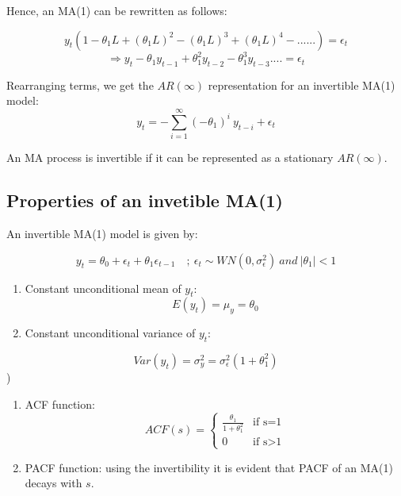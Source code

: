 \documentclass[]{book}
\theoremstyle{definition}
\theoremstyle{definition}
\theoremstyle{definition}
\theoremstyle{remark}
\let\BeginKnitrBlock\begin \let\EndKnitrBlock\end
\begin{document}
Hence, an MA(1) can be rewritten as follows:

\[y_t (1-\theta_1 L+(\theta_1L)^2-(\theta_1L)^3+ (\theta_1L)^4-......)=\epsilon_t\]
\[\Rightarrow y_t -\theta_1 y_{t-1} +\theta_1^2y_{t-2}-\theta_1^3 y_{t-3}....=\epsilon_t\]

Rearranging terms, we get the \(AR(\infty)\) representation for an
invertible MA(1) model:
\[y_t=-\sum_{i=1}^{\infty}(-\theta_1)^i \ y_{t-i}+\epsilon_t\]

\BeginKnitrBlock{definition}
\protect\hypertarget{def:unnamed-chunk-8}{}{\label{def:unnamed-chunk-8} }An
MA process is invertible if it can be represented as a stationary
\(AR(\infty)\).
\EndKnitrBlock{definition}

\hypertarget{properties-of-an-invetible-ma1}{%
\subsection{Properties of an invetible
MA(1)}\label{properties-of-an-invetible-ma1}}

An invertible MA(1) model is given by:

\[ y_t = \theta_0 + \epsilon_t + \theta_1 \epsilon_{t-1} \quad ; \ \epsilon_t\sim WN(0, \sigma_\epsilon^2) \ and \  |\theta_1|<1\]

\begin{enumerate}
\def\labelenumi{\arabic{enumi}.}
\item
  Constant unconditional mean of \(y_t\): \[E(y_t)=\mu_y =\theta_0 \]
\item
  Constant unconditional variance of \(y_t\):
\end{enumerate}

\[Var(y_t)=\sigma^2_y=\sigma^2_\epsilon(1+\theta_1^2)\])

\begin{enumerate}
\def\labelenumi{\arabic{enumi}.}
\setcounter{enumi}{2}
\item
  ACF function: \begin{equation*}
    ACF(s) =
    \begin{cases}
   \frac{\theta_1}{1+\theta_1^2} & \text{if  s=1}\\
   0 & \text{if s>1}
    \end{cases}
   \end{equation*}
\item
  PACF function: using the invertibility it is evident that PACF of an
  MA(1) decays with \(s\).
\end{enumerate}
\end{document}
